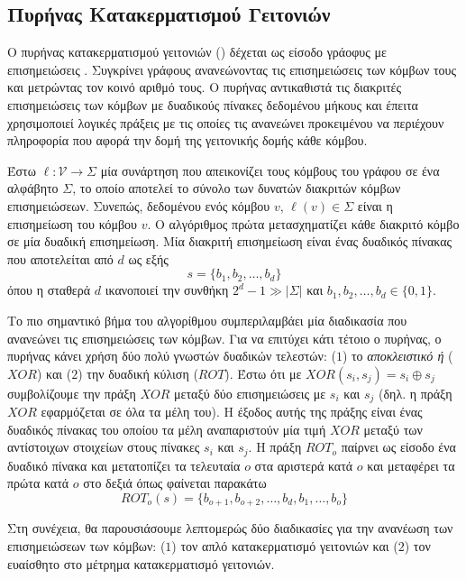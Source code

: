 \subsection{Πυρήνας Κατακερματισμού Γειτονιών}
Ο πυρήνας κατακερματισμού γειτονιών () δέχεται ως είσοδο γράοφυς με επισημειώσεις \cite{Hido2009}.
Συγκρίνει γράφους ανανεώνοντας τις επισημειώσεις των κόμβων τους και μετρώντας τον κοινό αριθμό τους.
Ο πυρήνας αντικαθιστά τις διακριτές επισημειώσεις των κόμβων με δυαδικούς πίνακες δεδομένου μήκους και έπειτα χρησιμοποιεί λογικές πράξεις με τις οποίες τις ανανεώνει προκειμένου να περιέχουν πληροφορία που αφορά την δομή της γειτονικής δομής κάθε κόμβου.

Έστω $\ell : \mathcal{V} \rightarrow \Sigma$ μία συνάρτηση που απεικονίζει τους κόμβους του γράφου σε ένα αλφάβητο $\Sigma$, το οποίο αποτελεί το σύνολο των δυνατών διακριτών κόμβων επισημειώσεων.
Συνεπώς, δεδομένου ενός κόμβου $v$, $\ell(v) \in \Sigma$  είναι η επισημείωση του κόμβου $v$.
Ο αλγόριθμος πρώτα μετασχηματίζει κάθε διακριτό κόμβο σε μία δυαδική επισημείωση.
Μία διακριτή επισημείωση είναι ένας δυαδικός πίνακας που αποτελείται από $d$  ως εξής
\begin{equation*}
    s = \{ b_1, b_2, \ldots, b_d \}
\end{equation*}
όπου η σταθερά $d$ ικανοποιεί την συνθήκη $2^d - 1 \gg |\Sigma|$ και $b_1, b_2, \ldots, b_d \in \{0, 1\}$.

Το πιο σημαντικό βήμα του αλγορίθμου συμπεριλαμβάει μία διαδικασία που ανανεώνει τις επισημειώσεις των κόμβων.
Για να επιτύχει κάτι τέτοιο ο πυρήνας, ο πυρήνας κάνει χρήση δύο πολύ γνωστών δυαδικών τελεστών: ($1$) το \textit{αποκλειστικό ή} ($XOR$) και ($2$) την δυαδική κύλιση ($ROT$).
Έστω ότι με $XOR(s_i, s_j) = s_i \oplus s_j$ συμβολίζουμε την πράξη $XOR$ μεταξύ δύο επισημειώσεις με  $s_i$ και $s_j$ (δηλ. η πράξη $XOR$ εφαρμόζεται σε όλα τα μέλη του).
Η έξοδος αυτής της πράξης είναι ένας δυαδικός πίνακας του οποίου τα μέλη αναπαριστούν μία τιμή $XOR$ μεταξύ των αντίστοιχων στοιχείων στους πίνακες $s_i$ και $s_j$.
Η πράξη $ROT_o$ παίρνει ως είσοδο ένα δυαδικό πίνακα και μετατοπίζει τα τελευταία $o$  στα αριστερά κατά $o$  και μεταφέρει τα πρώτα κατά $o$ στο δεξιά όπως φαίνεται παρακάτω
\begin{equation*}
    ROT_o(s) = \{ b_{o+1}, b_{o+2}, \ldots, b_d, b_1, \ldots, b_o \}
\end{equation*}

Στη συνέχεια, θα παρουσιάσουμε λεπτομερώς δύο διαδικασίες για την ανανέωση των επισημειώσεων των κόμβων: ($1$) τον απλό κατακερματισμό γειτονιών και ($2$) τον ευαίσθητο στο μέτρημα κατακερματισμό γειτονιών.

